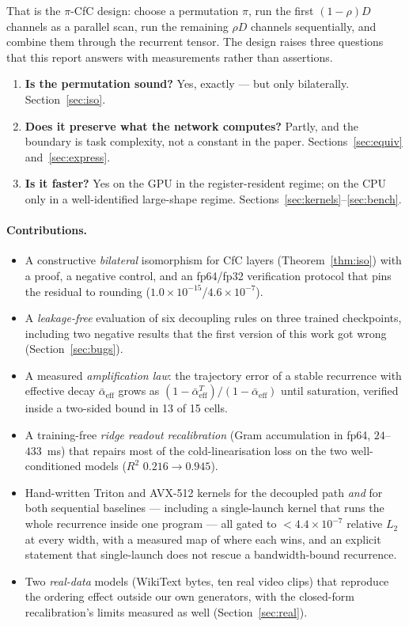 \documentclass[11pt]{article}
\theoremstyle{definition}
\newcommand{\piCfC}{\ensuremath{\pi}-CfC}
\newcommand{\abar}{\bar{\alpha}_{\mathrm{eff}}}
\begin{document}
That is the \piCfC{} design: choose a permutation $\pi$, run the first $(1-\rho)D$ channels as a parallel scan,
run the remaining $\rho D$ channels sequentially, and combine them through the recurrent tensor. The design
raises three questions that this report answers with measurements rather than assertions.

\begin{enumerate}[leftmargin=1.4em]
\item \textbf{Is the permutation sound?} Yes, exactly --- but only bilaterally. Section~\ref{sec:iso}.
\item \textbf{Does it preserve what the network computes?} Partly, and the boundary is task complexity, not
      a constant in the paper. Sections~\ref{sec:equiv} and~\ref{sec:express}.
\item \textbf{Is it faster?} Yes on the GPU in the register-resident regime; on the CPU only in a
      well-identified large-shape regime. Sections~\ref{sec:kernels}--\ref{sec:bench}.
\end{enumerate}

\paragraph{Contributions.}
\begin{itemize}[leftmargin=1.4em]
\item A constructive \emph{bilateral} isomorphism for CfC layers (Theorem~\ref{thm:iso}) with a proof, a
      negative control, and an fp64/fp32 verification protocol that pins the residual to rounding
      ($1.0\times10^{-15}$/$4.6\times10^{-7}$).
\item A \emph{leakage-free} evaluation of six decoupling rules on three trained checkpoints, including
      two negative results that the first version of this work got wrong (Section~\ref{sec:bugs}).
\item A measured \emph{amplification law}: the trajectory error of a stable recurrence with effective
      decay $\abar$ grows as $(1-\abar^T)/(1-\abar)$ until saturation, verified inside a two-sided bound in
      13 of 15 cells.
\item A training-free \emph{ridge readout recalibration} (Gram accumulation in fp64, $24$--$433$~ms) that repairs
      most of the cold-linearisation loss on the two well-conditioned models ($R^2$ $0.216\to0.945$).
\item Hand-written Triton and AVX-512 kernels for the decoupled path \emph{and} for both sequential
      baselines --- including a single-launch kernel that runs the whole recurrence inside one program ---
      all gated to $<4.4\times10^{-7}$ relative $L_2$ at every width, with a measured map of where each
      wins, and an explicit statement that single-launch does not rescue a bandwidth-bound recurrence.
\item Two \emph{real-data} models (WikiText bytes, ten real video clips) that reproduce the ordering
      effect outside our own generators, with the closed-form recalibration's limits measured as well
      (Section~\ref{sec:real}).
\end{itemize}
\end{document}
